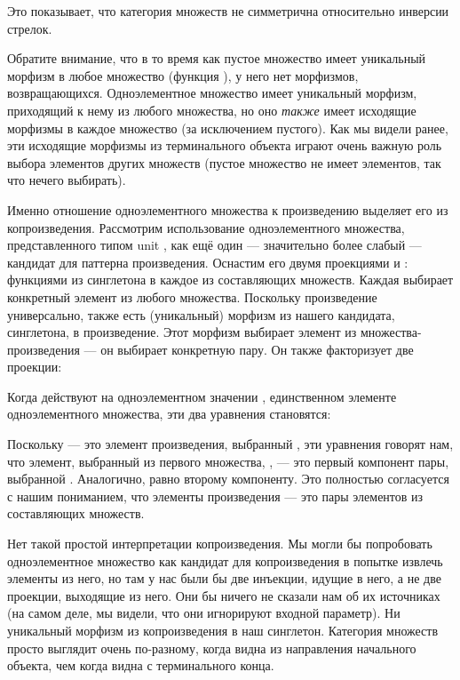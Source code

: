 Это показывает, что категория множеств не симметрична относительно
инверсии стрелок.

Обратите внимание, что в то время как пустое множество имеет уникальный морфизм в любое множество (функция
), у него нет морфизмов, возвращающихся. Одноэлементное
множество имеет уникальный морфизм, приходящий к нему из любого множества, но оно
\emph{также} имеет исходящие морфизмы в каждое множество (за исключением пустого).
Как мы видели ранее, эти исходящие морфизмы из терминального
объекта играют очень важную роль выбора элементов других множеств (пустое
множество не имеет элементов, так что нечего выбирать).

Именно отношение одноэлементного множества к произведению выделяет его
из копроизведения. Рассмотрим использование одноэлементного множества, представленного
типом unit \code{()}, как ещё один --- значительно более слабый ---
кандидат для паттерна произведения. Оснастим его двумя проекциями
 и : функциями из синглетона в каждое из
составляющих множеств. Каждая выбирает конкретный элемент из любого множества.
Поскольку произведение универсально, также есть (уникальный) морфизм
 из нашего кандидата, синглетона, в произведение. Этот
морфизм выбирает элемент из множества-произведения --- он выбирает
конкретную пару. Он также факторизует две проекции:

Когда действуют на одноэлементном значении \code{()}, единственном элементе
одноэлементного множества, эти два уравнения становятся:

Поскольку  --- это элемент произведения, выбранный ,
эти уравнения говорят нам, что элемент, выбранный  из
первого множества, , --- это первый компонент пары, выбранной
. Аналогично,  равно второму компоненту.
Это полностью согласуется с нашим пониманием, что элементы
произведения --- это пары элементов из составляющих множеств.

Нет такой простой интерпретации копроизведения. Мы могли бы попробовать
одноэлементное множество как кандидат для копроизведения в попытке
извлечь элементы из него, но там у нас были бы две инъекции,
идущие в него, а не две проекции, выходящие из него. Они бы
ничего не сказали нам об их источниках (на самом деле, мы видели, что они игнорируют
входной параметр). Ни уникальный морфизм из копроизведения
в наш синглетон. Категория множеств просто выглядит очень по-разному, когда
видна из направления начального объекта, чем когда видна
с терминального конца.

